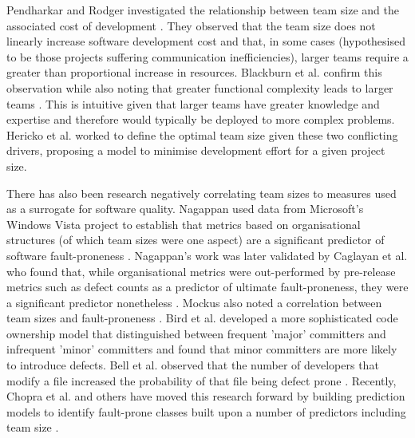 Pendharkar and Rodger investigated the relationship between team size and the associated cost of development \citep{pendharkar2009relationship}. They observed that the team size does not linearly increase software development cost and that, in some cases (hypothesised to be those projects suffering communication inefficiencies), larger teams require a greater than proportional increase in resources. Blackburn et al. confirm this observation while also noting that greater functional complexity leads to larger teams \citep{blackburn2006brooks}. This is intuitive given that larger teams have greater knowledge and expertise and therefore would typically be deployed to more complex problems. Hericko et al. worked to define the optimal team size given these two conflicting drivers, proposing a model to minimise development effort for a given project size\citep{herivcko2008approach}.

There has also been research negatively correlating team sizes to measures used as a surrogate for software quality. Nagappan used data from Microsoft's Windows Vista project to establish that metrics based on organisational structures (of which team sizes were one aspect) are a significant predictor of software fault-proneness \citep{nagappan2008influence}. Nagappan's work was later validated by Caglayan et al. who found that, while organisational metrics were out-performed by pre-release metrics such as defect counts as a predictor of ultimate fault-proneness, they were a significant predictor nonetheless \citep{caglayan2015merits}. Mockus also noted a correlation between team sizes and fault-proneness \citep{mockus2010organizational}. Bird et al. \citep{bird2011don} developed a more sophisticated code ownership model that distinguished between frequent 'major' committers and infrequent 'minor' committers and found that minor committers are more likely to introduce defects. Bell et al. observed that the number of developers that modify a file increased the probability of that file being defect prone \citep{bell2013limited}. Recently, Chopra et al. and others have moved this research forward by building prediction models to identify fault-prone classes built upon a number of predictors including team size \citep{madeyski2015process, chopra2018empirical}.


